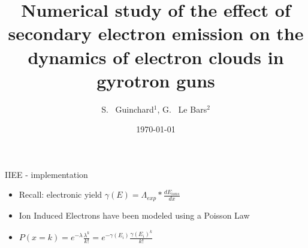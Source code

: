 \documentclass[aspectratio=169,xcolor=dvipsnames,8pt]{beamer}
\title[Summary]{Numerical study of the effect of secondary electron emission on the dynamics of electron clouds in gyrotron guns}
\author[S.Guinchard] {S. ~Guinchard$^{1}$, G. ~Le Bars$^{2}$}
\institute[SPH] %
{
    $^1$ Ecole Polytechnique Fédérale de Lausanne (EPFL), Physics Section (SPH), CH-1015 Lausanne, Switzerland\\
    $^2$ Ecole Polytechnique Fédérale de Lausanne (EPFL), Swiss Plasma Center (SPC), CH-1015 Lausanne, Switzerland\\
    \vspace{1cm}
}
\date{\today} %
\begin{document}
\begin{frame}
    \titlepage
\end{frame}


\begin{frame}{IIEE - implementation}

\begin{itemize}


\item{Recall: electronic yield $\gamma(E) = \Lambda_{exp}*\frac{dE_{ions}}{dx}$ }
\item{Ion Induced Electrons have been modeled using a Poisson Law}
\vspace{1cm}
\item{$P(x=k) = e^{-\lambda}\frac{\lambda^k}{k!} =  e^{-\gamma(E_i)}\frac{\gamma(E_i)^k}{k!} $}
\end{itemize}
\end{frame}


\end{document}
